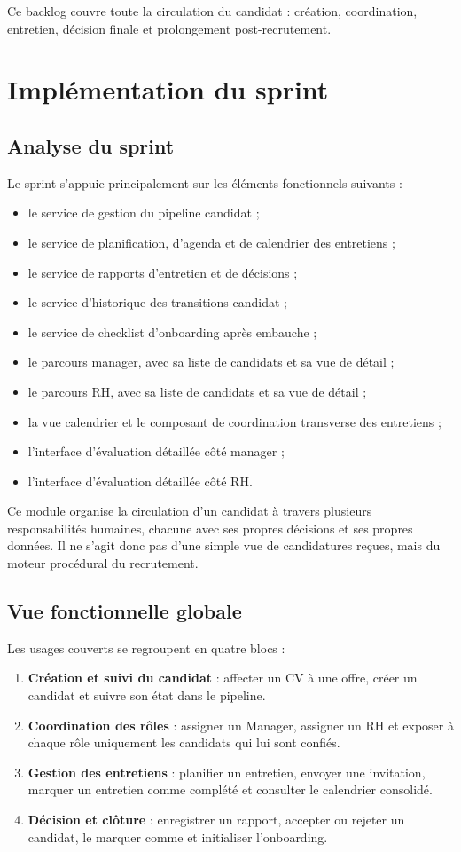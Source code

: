 Ce backlog couvre toute la circulation du candidat : création, coordination, entretien, décision finale et prolongement post-recrutement.

\section{Implémentation du sprint}

\subsection{Analyse du sprint}
Le sprint s'appuie principalement sur les éléments fonctionnels suivants :
\begin{itemize}
  \item le service de gestion du pipeline candidat ;
  \item le service de planification, d'agenda et de calendrier des entretiens ;
  \item le service de rapports d'entretien et de décisions ;
  \item le service d'historique des transitions candidat ;
  \item le service de checklist d'onboarding après embauche ;
  \item le parcours manager, avec sa liste de candidats et sa vue de détail ;
  \item le parcours RH, avec sa liste de candidats et sa vue de détail ;
  \item la vue calendrier et le composant de coordination transverse des entretiens ;
  \item l'interface d'évaluation détaillée côté manager ;
  \item l'interface d'évaluation détaillée côté RH.
\end{itemize}

Ce module organise la circulation d'un candidat à travers plusieurs responsabilités humaines, chacune avec ses propres décisions et ses propres données. Il ne s'agit donc pas d'une simple vue de candidatures reçues, mais du moteur procédural du recrutement.

\subsection{Vue fonctionnelle globale}
Les usages couverts se regroupent en quatre blocs :
\begin{enumerate}
  \item \textbf{Création et suivi du candidat} : affecter un CV à une offre, créer un candidat et suivre son état dans le pipeline.
  \item \textbf{Coordination des rôles} : assigner un Manager, assigner un RH et exposer à chaque rôle uniquement les candidats qui lui sont confiés.
  \item \textbf{Gestion des entretiens} : planifier un entretien, envoyer une invitation, marquer un entretien comme complété et consulter le calendrier consolidé.
  \item \textbf{Décision et clôture} : enregistrer un rapport, accepter ou rejeter un candidat, le marquer comme  et initialiser l'onboarding.
\end{enumerate}

